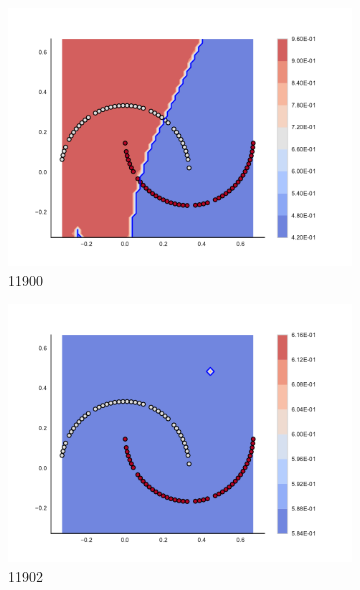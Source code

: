 \begin{figure}[h]
\begin{subfigure}[b]{0.09\textwidth}
    \includegraphics[clip, trim=2.35cm 1.75cm 4.5cm 0cm,width=\textwidth]{img/convergence/11900.pdf}
    \caption{11900}
    \label{fig:convergence_11900}
\end{subfigure}
%
\begin{subfigure}[b]{0.09\textwidth}
    \includegraphics[clip, trim=2.35cm 1.75cm 4.5cm 0cm,width=\textwidth]{img/convergence/11902.pdf}
    \caption{11902}
    \label{fig:convergence_11902}
\end{subfigure}
%
\begin{subfigure}[b]{0.09\textwidth}

\end{subfigure}
\end{figure}
